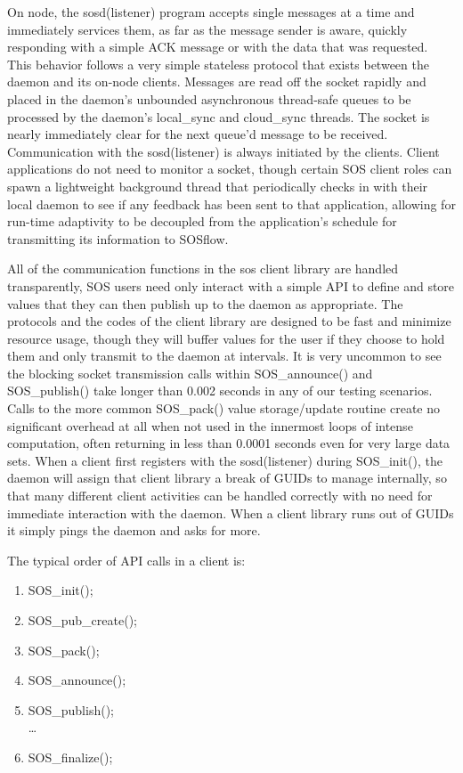 On node, the sosd(listener) program accepts single messages at a time
and immediately services them, as far as the message sender is aware,
quickly responding with a simple ACK message or with the data that was
requested.  This behavior follows a very simple stateless protocol
that exists between the daemon and its on-node clients. Messages are
read off the socket rapidly and placed in the daemon's unbounded
asynchronous thread-safe queues to be processed by the daemon's
local\_sync and cloud\_sync threads. The socket is nearly immediately
clear for the next queue'd message to be received. Communication with
the sosd(listener) is always initiated by the clients.  Client
applications do not need to monitor a socket, though certain SOS
client roles can spawn a lightweight background thread that
periodically checks in with their local daemon to see if any feedback
has been sent to that application, allowing for run-time adaptivity to
be decoupled from the application's schedule for transmitting its
information to SOSflow.

All of the communication functions in the sos client library are
handled transparently, SOS users need only interact with a simple API
to define and store values that they can then publish up to the daemon
as appropriate.  The protocols and the codes of the client library are
designed to be fast and minimize resource usage, though they will
buffer values for the user if they choose to hold them and only
transmit to the daemon at intervals.  It is very uncommon to see the
blocking socket transmission calls within SOS\_announce() and
SOS\_publish() take longer than 0.002 seconds in any of our testing
scenarios. Calls to the more common SOS\_pack() value storage/update
routine create no significant overhead at all when not used in the
innermost loops of intense computation, often returning in less than
0.0001 seconds even for very large data sets. When a client first
registers with the sosd(listener) during SOS\_init(), the daemon will
assign that client library a break of GUIDs to manage internally, so
that many different client activities can be handled correctly with no
need for immediate interaction with the daemon. When a client library
runs out of GUIDs it simply pings the daemon and asks for more.

The typical order of API calls in a client is:
\begin{enumerate}
    \item SOS\_init();
    \item SOS\_pub\_create();
    \item SOS\_pack();
    \item SOS\_announce();
    \item SOS\_publish();\\
    \dots
    \item SOS\_finalize();
\end{enumerate}

